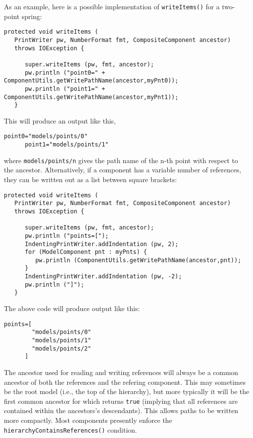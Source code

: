 \documentclass{article}
\begin{document}
As an example, here is a possible implementation of {\tt writeItems()}
for a two-point spring:
\begin{lstlisting}[]
   protected void writeItems (
   PrintWriter pw, NumberFormat fmt, CompositeComponent ancestor)
   throws IOException {

      super.writeItems (pw, fmt, ancestor);
      pw.println ("point0=" + ComponentUtils.getWritePathName(ancestor,myPnt0));
      pw.println ("point1=" + ComponentUtils.getWritePathName(ancestor,myPnt1));
   }
\end{lstlisting}
This will produce an output like this,
\begin{lstlisting}[]
      point0="models/points/0"
      point1="models/points/1"
\end{lstlisting}
where {\tt models/points/n} gives the path name of the n-th point with
respect to the ancestor.
Alternatively, if a component has a variable number of references,
they can be written out as a list between square brackets:
\begin{lstlisting}[]
   protected void writeItems (
   PrintWriter pw, NumberFormat fmt, CompositeComponent ancestor)
   throws IOException {

      super.writeItems (pw, fmt, ancestor);
      pw.println ("points=[");
      IndentingPrintWriter.addIndentation (pw, 2);
      for (ModelComponent pnt : myPnts) {
         pw.println (ComponentUtils.getWritePathName(ancestor,pnt));
      }
      IndentingPrintWriter.addIndentation (pw, -2);
      pw.println ("]");
   }
\end{lstlisting}
The above code will produce output like this:
\begin{lstlisting}[]
      points=[
        "models/points/0"
        "models/points/1"
        "models/points/2"
      ]
\end{lstlisting}

\begin{sideblock}
The ancestor used for reading and writing references will always be a
common ancestor of both the references and the refering component.
This may sometimes be the root model (i.e., the top of the hierarchy),
but more typically it will be the first common ancestor for which
 returns {\tt true} (implying that all
references are contained within the ancestors's descendants).  This allows
paths to be written more compactly.
Most  components
presently enforce the {\tt hierarchyContainsReferences()} condition.
\end{sideblock}
\end{document}
